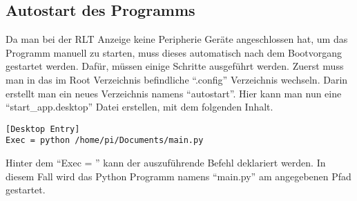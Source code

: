 \subsection{Autostart des Programms} \label{autostart}
Da man bei der RLT Anzeige keine Peripherie Geräte angeschlossen hat, um das Programm manuell zu starten, muss dieses automatisch nach dem Bootvorgang gestartet werden. Dafür, müssen einige Schritte ausgeführt werden. \newline Zuerst muss man in das im Root Verzeichnis befindliche \enquote{.config} Verzeichnis wechseln. Darin erstellt man ein neues Verzeichnis namens \enquote{autostart}. Hier kann man nun eine \enquote{start\_app.desktop} Datei erstellen, mit dem folgenden Inhalt.
\begin{lstlisting}
[Desktop Entry]
Exec = python /home/pi/Documents/main.py
\end{lstlisting}
Hinter dem \enquote{Exec = } kann der auszuführende Befehl deklariert werden. In diesem Fall wird das Python Programm namens \enquote{main.py} am angegebenen Pfad gestartet. \cite{Grace_Xing:2021}
